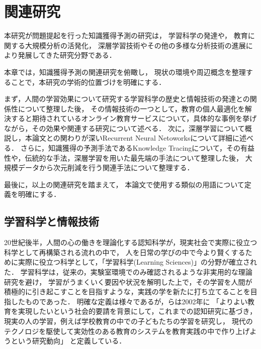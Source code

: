 \chapter{関連研究}
\label{chap:previous}
\fancyhf{}
\rhead{\thepage}
\cfoot{\thepage}


本研究が問題提起を行った知識獲得予測の研究は，
学習科学の発達や，
教育に関する大規模分析の活発化，
深層学習技術やその他の多様な分析技術の進展により発展してきた研究分野である．

本章では，知識獲得予測の関連研究を俯瞰し，
現状の環境や周辺概念を整理することで，本研究の学術的位置づけを明確にする．


まず，人間の学習効果について研究する学習科学の歴史と情報技術の発達との関係性について整理した後，
その情報技術の一つとして，教育の個人最適化を解決すると期待されているオンライン教育サービスについて，具体的な事例を挙げながら，その効果や関連する研究について述べる．
次に，深層学習について概説し，本論文との関わりが深いRecurrent Neural Netoworksについて詳細に述べる．
さらに，知識獲得の予測手法であるKnowledge Tracingについて，その有益性や，伝統的な手法，深層学習を用いた最先端の手法について整理した後，
大規模データから次元削減を行う関連手法について整理する．

最後に，以上の関連研究を踏まえて，
本論文で使用する類似の用語について定義を明確にする．


\section{学習科学と情報技術}

20世紀後半，人間の心の働きを理論化する認知科学が，現実社会で実際に役立つ科学として再構築される流れの中で，
人を日常の学びの中で今より賢くするために実際に役立つ科学として，「学習科学(Learning Sciences)」の分野が確立された\cite{白水始2014学習科学の新展開}．
学習科学は，従来の，実験室環境でのみ確認されるような非実用的な理論研究を避け，
学習がうまくいく要因や状況を解明した上で，その学習を人間が積極的に引き起こすことを目指すような，実践の学を新たに打ち立てることを目指したものであった．
明確な定義は様々であるが，\cite{三宅なほみ2002学習環境のデザイン実験}らは2002年に
「よりよい教育を実現したいという社会的要請を背景にして，これまでの認知研究に基づき，
現実の人の学習，例えば学校教育の中での子どもたちの学習を研究し，
現代のテクノロジを駆使して実効性のある教育のシステムを教育実践の中で作り上げようという研究動向」
と定義している．


